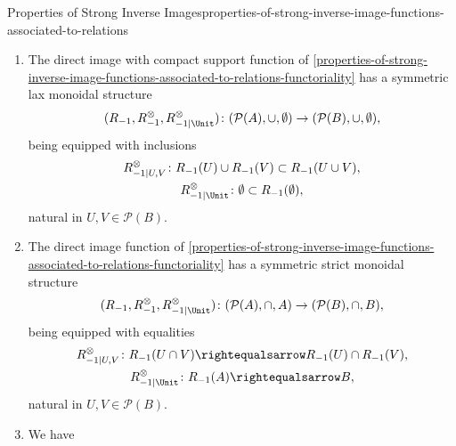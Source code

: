 \begin{proposition}{Properties of Strong Inverse Images}{properties-of-strong-inverse-image-functions-associated-to-relations}
\begin{enumerate}
            natural in $U,V\in\mathcal{P}(B)$.
        \item\label{properties-of-strong-inverse-image-functions-associated-to-relations-symmetric-lax-monoidality-with-respect-to-unions}The direct image with compact support function of \cref{properties-of-strong-inverse-image-functions-associated-to-relations-functoriality} has a symmetric lax monoidal structure
            \[
                (R_{-1},R^{\otimes}_{-1},R^{\otimes}_{-1|\Unit})
                \colon
                (\mathcal{P}(A),\cup,\emptyset)
                \to
                (\mathcal{P}(B),\cup,\emptyset),
            \]%
            being equipped with inclusions%
            \[
                \begin{gathered}
                    R^{\otimes}_{-1|U,V}   \colon R_{-1}(U)\cup R_{-1}(V) \subset R_{-1}(U\cup V),\\
                    R^{\otimes}_{-1|\Unit} \colon \emptyset               \subset R_{-1}(\emptyset),
                \end{gathered}
            \]%
            natural in $U,V\in\mathcal{P}(B)$.
        \item\label{properties-of-strong-inverse-image-functions-associated-to-relations-symmetric-strict-monoidality-with-respect-to-intersections}The direct image function of \cref{properties-of-strong-inverse-image-functions-associated-to-relations-functoriality} has a symmetric strict monoidal structure
            \[
                (R_{-1},R^{\otimes}_{-1},R^{\otimes}_{-1|\Unit})
                \colon
                (\mathcal{P}(A),\cap,A)
                \to
                (\mathcal{P}(B),\cap,B),
            \]%
            being equipped with equalities%
            \[
                \begin{gathered}
                    R^{\otimes}_{-1|U,V}   \colon R_{-1}(U\cap V) \rightequalsarrow R_{-1}(U)\cap R_{-1}(V),\\
                    R^{\otimes}_{-1|\Unit} \colon R_{-1}(A)       \rightequalsarrow B,
                \end{gathered}
            \]%
            natural in $U,V\in\mathcal{P}(B)$.
        \item\label{properties-of-strong-inverse-image-functions-associated-to-relations-interaction-with-weak-inverse-images-1}We have
            \[
\]
\end{enumerate}
\end{proposition}
